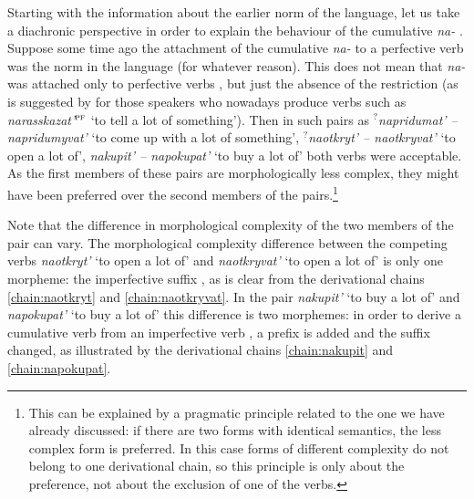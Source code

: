 Starting with the information about the earlier norm of the language, let us take a diachronic perspective in order to explain the behaviour of the cumulative  \textit{na-}  . Suppose some time ago the attachment of the cumulative  \textit{na-}   to a perfective verb  was the norm in the language (for whatever reason). This does not mean that \textit{na-}   was attached only to perfective verbs , but just the absence of the restriction (as is suggested by \citet{Tatevosov:13a} for those speakers who nowadays produce verbs such as \textit{narasskazat'}$^{\textsc{pf}}$ `to tell a lot of something'). Then in such pairs as \textit{$^?$napridumat' -- napridumyvat'} `to come up with a lot of something', \textit{$^?$naotkryt' -- naotkryvat'} `to open a lot of', \textit{nakupit' -- napokupat'} `to buy a lot of' both verbs were acceptable. As the first members of these pairs are morphologically less complex, they might have been preferred over the second members of the pairs.\footnote{This can be explained by a pragmatic principle related to the one we have already discussed: if there are two forms with identical semantics, the less complex form is preferred. In this case forms of different complexity do not belong to one derivational chain, so this principle is only about the preference, not about the exclusion of one of the verbs.} 

Note that the difference in morphological complexity of the two members of the pair can vary. The morphological complexity difference between the competing verbs \textit{naotkryt'} `to open a lot of' and \textit{naotkryvat'} `to open a lot of' is only one morpheme: the imperfective suffix  , as is clear from the derivational chains \ref{chain:naotkryt} and \ref{chain:naotkryvat}. In the pair  \textit{nakupit'} `to buy a lot of' and  \textit{napokupat'} `to buy a lot of' this difference is two morphemes: in order to derive a cumulative  verb from an imperfective verb , a prefix is added and the suffix changed, as illustrated by the derivational chains \ref{chain:nakupit} and \ref{chain:napokupat}.

